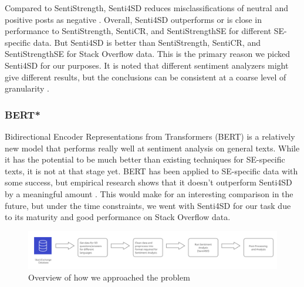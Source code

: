 \documentclass[conference]{IEEEtran}
\begin{document}
Compared to SentiStrength, Senti4SD reduces misclassifications of neutral and positive posts as negative \cite{b21}. Overall, Senti4SD outperforms or is close in performance to SentiStrength, SentiCR, and SentiStrengthSE for different SE-specific data\cite{b21, b26}. But Senti4SD is better than SentiStrength, SentiCR, and SentiStrengthSE for Stack Overflow data. This is the primary reason we picked Senti4SD for our purposes. It is noted that different sentiment analyzers might give different results, but the conclusions can be consistent at a coarse level of granularity \cite{b26}.\\

\subsubsection{BERT*}
Bidirectional Encoder Representations from Transformers (BERT) is a relatively new model that performs really well at sentiment analysis on general texts\cite{b27}. While it has the potential to be much better than existing techniques for SE-specific texts, it is not at that stage yet. BERT has been applied to SE-specific data with some success\cite{b22}, but empirical research shows that it doesn't outperform Senti4SD by a meaningful amount \cite{b26}. This would make for an interesting comparison in the future, but under the time constraints, we went with Senti4SD for our task due to its maturity and good performance on Stack Overflow data. \\

\begin{figure}[tbp]
\centering
\includegraphics[width=\textwidth]{4710_method_summary.png}
\caption{Overview of how we approached the problem}
\label{fig}
\end{figure}
\end{document}
